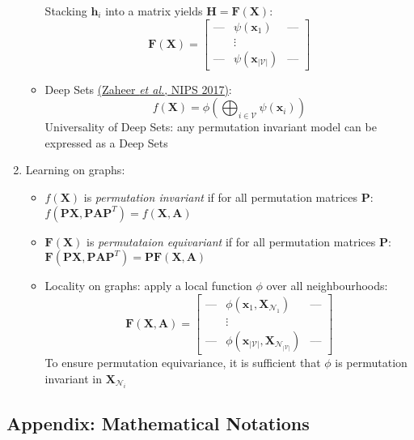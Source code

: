 \documentclass{article}
\begin{document}
\begin{enumerate}
\begin{itemize}[topsep=0pt]
		Stacking $\mathbf{h}_i$ into a matrix yields $\mathbf{H}=\bm{F}(\mathbf{X})$:
		$$\bm{F}(\mathbf{X})=\begin{bmatrix}
			\text{---} & \!\!\!\psi(\mathbf{x}_1) & \!\!\!\text{{--}{--}} \\ 
			{} & \vdots & {} \\
			\text{{--}{--}} & \!\!\!\psi(\mathbf{x}_{|\mathcal{V}|}) & \!\!\!\text{{--}{--}}
		\end{bmatrix}$$
		\item Deep Sets \href{https://papers.nips.cc/paper/2017/file/f22e4747da1aa27e363d86d40ff442fe-Paper.pdf}{(Zaheer \textit{et al.}, NIPS 2017)}: 
		$$f(\mathbf{X})=\phi\left(\bigoplus_{i\in\mathcal{V}}\psi(\mathbf{x}_i)\right)$$
		Universality of Deep Sets: any permutation invariant model can be expressed as a Deep Sets
	\end{itemize}

	\item Learning on graphs:
	\begin{itemize}[topsep=0pt]
		\item $f(\mathbf{X})$ is \textit{permutation invariant} if for all permutation matrices $\mathbf{P}$: $f(\mathbf{PX},\mathbf{PA}\mathbf{P}^T)=f(\mathbf{X},\mathbf{A})$
		\item $\bm{F}(\mathbf{X})$ is \textit{permutataion equivariant} if for all permutation matrices $\mathbf{P}$: $\bm{F}(\mathbf{PX},\mathbf{PA}\mathbf{P}^T)=\mathbf{P}\bm{F}(\mathbf{X},\mathbf{A})$ 
		\item Locality on graphs: apply a local function $\phi$ over all neighbourhoods:
		$$\bm{F}(\mathbf{X},\mathbf{A})=\begin{bmatrix}
			\text{---} & \!\!\!\phi(\mathbf{x}_1,\mathbf{X}_{\mathcal{N}_1}) & \!\!\!\text{{--}{--}} \\ 
			{} & \vdots & {} \\
			\text{{--}{--}} & \!\!\!\phi(\mathbf{x}_{|\mathcal{V}|},\mathbf{X}_{\mathcal{N}_{|\mathcal{V}|}}) & \!\!\!\text{{--}{--}}
		\end{bmatrix}$$
		To ensure permutation equivariance, it is sufficient that $\phi$ is permutation invariant in $\mathbf{X}_{\mathcal{N}_i}$
	\end{itemize}
\end{enumerate}

\newpage

\subsection*{Appendix: Mathematical Notations}
\end{document}
